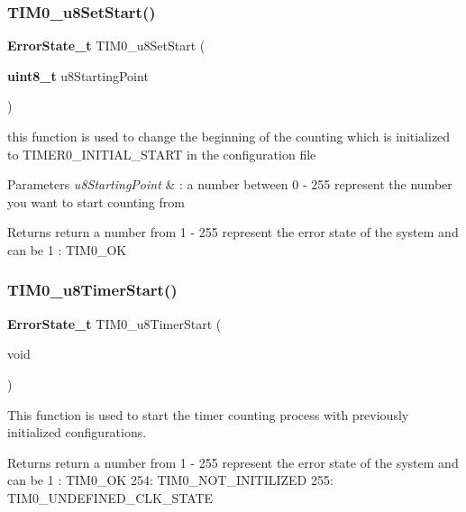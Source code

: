 \subsubsection{T\+I\+M0\+\_\+u8\+Set\+Start()}
{\footnotesize\ttfamily \textbf{ Error\+State\+\_\+t} T\+I\+M0\+\_\+u8\+Set\+Start (\begin{DoxyParamCaption}\item[{\textbf{ uint8\+\_\+t}}]{u8\+Starting\+Point }\end{DoxyParamCaption})}



this function is used to change the beginning of the counting which is initialized to T\+I\+M\+E\+R0\+\_\+\+I\+N\+I\+T\+I\+A\+L\+\_\+\+S\+T\+A\+RT in the configuration file 


\begin{DoxyParams}{Parameters}
{\em u8\+Starting\+Point} & \+: a number between 0 -\/ 255 represent the number you want to start counting from \\
\hline
\end{DoxyParams}
\begin{DoxyReturn}{Returns}
return a number from 1 -\/ 255 represent the error state of the system and can be 1 \+: T\+I\+M0\+\_\+\+OK 
\end{DoxyReturn}
\mbox{\label{_t_i_m_e_r0_8c_af55bbe4c18d1c81a9ac0e9d0c1829e86}} 
\subsubsection{T\+I\+M0\+\_\+u8\+Timer\+Start()}
{\footnotesize\ttfamily \textbf{ Error\+State\+\_\+t} T\+I\+M0\+\_\+u8\+Timer\+Start (\begin{DoxyParamCaption}\item[{void}]{ }\end{DoxyParamCaption})}



This function is used to start the timer counting process with previously initialized configurations. 

\begin{DoxyReturn}{Returns}
return a number from 1 -\/ 255 represent the error state of the system and can be 1 \+: T\+I\+M0\+\_\+\+OK 254\+: T\+I\+M0\+\_\+\+N\+O\+T\+\_\+\+I\+N\+I\+T\+I\+L\+I\+Z\+ED 255\+: T\+I\+M0\+\_\+\+U\+N\+D\+E\+F\+I\+N\+E\+D\+\_\+\+C\+L\+K\+\_\+\+S\+T\+A\+TE 
\end{DoxyReturn}
\mbox{\label{_t_i_m_e_r0_8c_a879b492bece4a913fb4a0d0b0e96dcd1}} 

